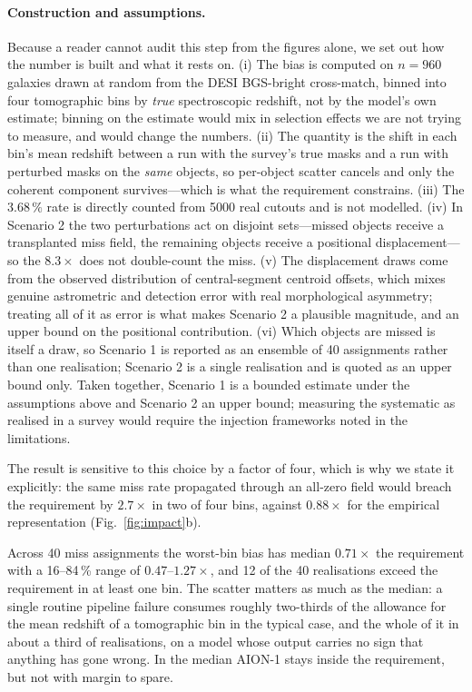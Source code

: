 \documentclass[11pt]{article}
\newcommand{\aion}{AION-1}
\begin{document}
\paragraph{Construction and assumptions.} Because a reader cannot audit this step from the
figures alone, we set out how the number is built and what it rests on. (i) The bias is
computed on $n=960$ galaxies drawn at random from the DESI BGS-bright cross-match, binned into
four tomographic bins by \emph{true} spectroscopic redshift, not by the model's own estimate;
binning on the estimate would mix in selection effects we are not trying to measure, and would
change the numbers. (ii) The quantity is the shift in each bin's mean redshift between a run
with the survey's true masks and a run with perturbed masks on the \emph{same} objects, so
per-object scatter cancels and only the coherent component survives---which is what the
requirement constrains. (iii) The $3.68\,\%$ rate is directly counted from 5000 real cutouts and
is not modelled. (iv) In Scenario 2 the two perturbations act on disjoint sets---missed objects
receive a transplanted miss field, the remaining objects receive a positional displacement---so
the $8.3\times$ does not double-count the miss. (v) The displacement draws come from the observed
distribution of central-segment centroid offsets, which mixes genuine astrometric and detection
error with real morphological asymmetry; treating all of it as error is what makes Scenario 2 a
plausible magnitude, and an upper bound on the positional contribution. (vi) Which objects are missed is itself a draw, so
Scenario 1 is reported as an ensemble of 40 assignments rather than one realisation; Scenario 2
is a single realisation and is quoted as an upper bound only. Taken together, Scenario 1 is a
bounded estimate under the assumptions above and Scenario 2 an upper bound; measuring the
systematic as realised in a survey would require the injection frameworks noted in the
limitations.

The result is sensitive to this choice by a factor of four, which is why we state it
explicitly: the same miss rate propagated through an all-zero field would breach the requirement
by $2.7\times$ in two of four bins, against $0.88\times$ for the empirical representation
(Fig.~\ref{fig:impact}b).

Across 40 miss assignments the worst-bin bias has median $0.71\times$ the requirement with a
16--84\,\% range of $0.47$--$1.27\times$, and 12 of the 40 realisations exceed the requirement in
at least one bin. The scatter matters as much as the median: a single routine pipeline failure
consumes roughly two-thirds of the allowance for the mean redshift of a tomographic bin in the
typical case, and the whole of it in about a third of realisations, on a model whose output
carries no sign that anything has gone wrong. In the median \aion{} stays inside the
requirement, but not with margin to spare.
\end{document}
